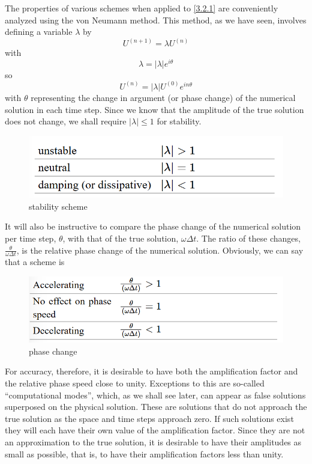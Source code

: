 The properties of various schemes when applied to \ref{3.2.1} are conveniently analyzed using the von Neumann method. This method, as we have seen, involves defining a variable $\lambda$ by
\begin{equation}\label{3.2.3}
	U^{(n+1)}=\lambda U^{(n)}
\end{equation}
with
$$\lambda=|\lambda|e^{i\theta}$$
so
\begin{equation}\label{3.2.5}
	U^{(n)}=|\lambda|U^{(0)}e^{in\theta}
\end{equation}
with $\theta$ representing the change in argument (or phase change) of the numerical solution in each time step. Since we know that the amplitude of the true solution does not change, we shall require $|\lambda|\leq 1$ for stability.
\begin{figure}[h]
	\centering
	\includegraphics[width=0.50\linewidth]{uploads/Screenshot 2024-11-11 225800.png}
	\caption{stability scheme}
	\label{fig:stab scheme}
\end{figure}
It will also be instructive to compare the phase change of the numerical solution per time step, $\theta$, with that of the true solution, $\omega\Delta t$. The ratio of these changes, $\frac{\theta}{\omega\Delta t}$, is the relative phase change of the numerical solution. Obviously, we can say that a scheme is
\begin{figure}[h]
	\centering
	\includegraphics[width=0.50\linewidth]{uploads/Screenshot 2024-11-11 230012.png}
	\caption{phase change}
	\label{fig:phase change}
\end{figure}
For accuracy, therefore, it is desirable to have both the amplification factor and the relative phase speed close to unity. Exceptions to this are so-called “computational modes”, which, as we shall see later, can appear as false solutions superposed on the physical solution. These are solutions that do not approach the true solution as the space and time steps approach zero. If such solutions exist they will each have their own value of the amplification factor. Since they are not an approximation to the true solution, it is desirable to have their amplitudes as small as possible, that is, to have their amplification factors less than unity.

